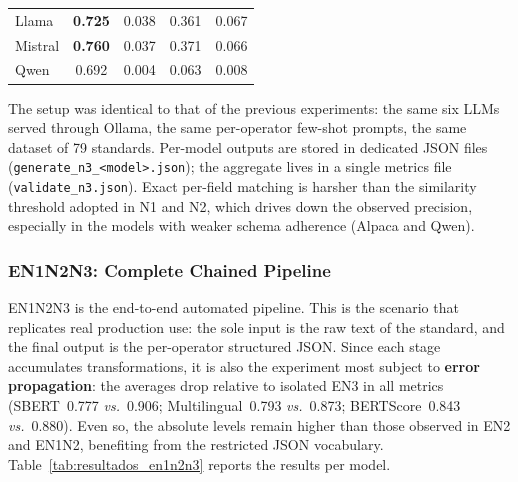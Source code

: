 \documentclass[a4paper,fleqn]{cas-sc}
\newcommand{\melhor}[1]{\textcolor{green!55!black}{#1}}
\newcommand{\pior}[1]{\textcolor{red!80!black}{#1}}
\begin{document}
\begin{table}[ht]
\begin{tabular}{lccccccccc}
Llama   & \multicolumn{2}{c}{\textbf{0.725}} & \multicolumn{2}{c}{\melhor{0.038}} & \multicolumn{2}{c}{0.361} & \multicolumn{3}{c}{\melhor{0.067}} \\
Mistral & \multicolumn{2}{c}{\melhor{\textbf{0.760}}} & \multicolumn{2}{c}{0.037} & \multicolumn{2}{c}{0.371} & \multicolumn{3}{c}{0.066} \\
Qwen    & \multicolumn{2}{c}{0.692} & \multicolumn{2}{c}{\pior{0.004}} & \multicolumn{2}{c}{\pior{0.063}} & \multicolumn{3}{c}{\pior{0.008}} \\
\hline
\end{tabular}
\end{table}

The setup was identical to that of the previous experiments: the same six LLMs served through Ollama, the same per-operator few-shot prompts, the same dataset of 79 standards. Per-model outputs are stored in dedicated JSON files (\texttt{generate\_n3\_<model>.json}); the aggregate lives in a single metrics file (\texttt{validate\_n3.json}). Exact per-field matching is harsher than the similarity threshold adopted in N1 and N2, which drives down the observed precision, especially in the models with weaker schema adherence (Alpaca and Qwen).

\subsubsection{EN1N2N3: Complete Chained Pipeline}

EN1N2N3 is the end-to-end automated pipeline. This is the scenario that replicates real production use: the sole input is the raw text of the standard, and the final output is the per-operator structured JSON. Since each stage accumulates transformations, it is also the experiment most subject to \textbf{error propagation}: the averages drop relative to isolated EN3 in all metrics (SBERT~0.777 \textit{vs.}~0.906; Multilingual~0.793 \textit{vs.}~0.873; BERTScore~0.843 \textit{vs.}~0.880). Even so, the absolute levels remain higher than those observed in EN2 and EN1N2, benefiting from the restricted JSON vocabulary. Table~\ref{tab:resultados_en1n2n3} reports the results per model.
\end{document}
